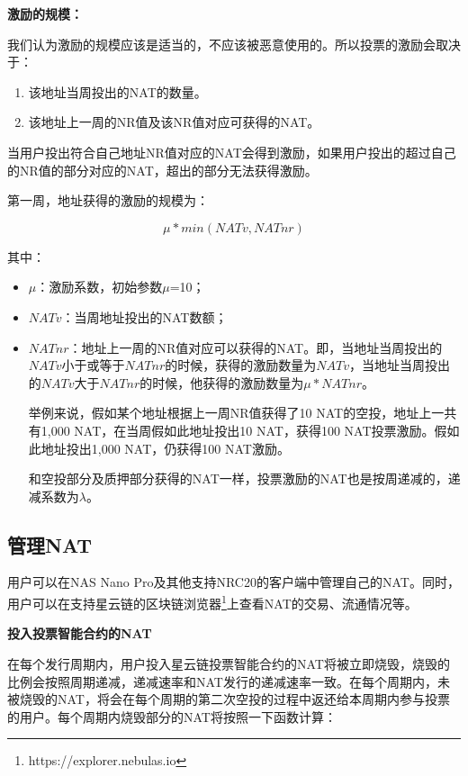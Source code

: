 \textbf{激励的规模：}

我们认为激励的规模应该是适当的，不应该被恶意使用的。所以投票的激励会取决于：

\begin{enumerate}
	\item 该地址当周投出的NAT的数量。
	\item 该地址上一周的NR值及该NR值对应可获得的NAT。
\end{enumerate}

当用户投出符合自己地址NR值对应的NAT会得到激励，如果用户投出的超过自己的NR值的部分对应的NAT，超出的部分无法获得激励。
	
第一周，地址获得的激励的规模为：

$$\mu*min(NATv, NATnr)$$

其中：

\begin{itemize}
	\item $\mu$：激励系数，初始参数$\mu$=10；
	\item $NATv$：当周地址投出的NAT数额；
	\item $NATnr$：地址上一周的NR值对应可以获得的NAT。即，当地址当周投出的$NATv$小于或等于$NATnr$的时候，获得的激励数量为$NATv$，当地址当周投出的$NATv$大于$NATnr$的时候，他获得的激励数量为$\mu*NATnr$。

举例来说，假如某个地址根据上一周NR值获得了10 NAT的空投，地址上一共有1,000 NAT，在当周假如此地址投出10 NAT，获得100 NAT投票激励。假如此地址投出1,000 NAT，仍获得100 NAT激励。

和空投部分及质押部分获得的NAT一样，投票激励的NAT也是按周递减的，递减系数为$\lambda$。

\end{itemize}

\subsection{管理NAT}

用户可以在NAS Nano Pro及其他支持NRC20的客户端中管理自己的NAT。同时，用户可以在支持星云链的区块链浏览器\footnote{https://explorer.nebulas.io}上查看NAT的交易、流通情况等。

\textbf{投入投票智能合约的NAT}

在每个发行周期内，用户投入星云链投票智能合约的NAT将被立即烧毁，烧毁的比例会按照周期递减，递减速率和NAT发行的递减速率一致。在每个周期内，未被烧毁的NAT，将会在每个周期的第二次空投的过程中返还给本周期内参与投票的用户。每个周期内烧毁部分的NAT将按照一下函数计算：


